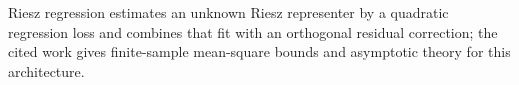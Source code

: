 Riesz regression estimates an unknown Riesz representer by a quadratic regression loss and combines that fit with an orthogonal residual correction; the cited work gives finite-sample mean-square bounds and asymptotic theory for this architecture.
